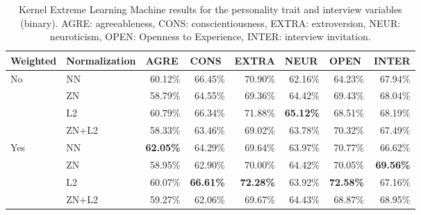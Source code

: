 \begin{table*}[h]
\begin{tabular}{|l|l|r|r|r|r|r|r|}
\hline
\rowcolor{Gray}
Weighted & Normalization & \multicolumn{1}{l|}{AGRE} & \multicolumn{1}{l|}{CONS} & \multicolumn{1}{l|}{EXTRA} & \multicolumn{1}{l|}{NEUR} & \multicolumn{1}{l|}{OPEN} & \multicolumn{1}{l|}{INTER} \\ \hline
\multirow{4}{*}{No} & NN & 60.12\% & 66.45\% & 70.90\% & 62.16\% & 64.23\% & 67.94\% \\ \cline{2-8} 
 & ZN & 58.79\% & 64.55\% & 69.36\% & 64.42\% & 69.43\% & 68.04\% \\ \cline{2-8} 
 & L2 & 60.79\% & 66.34\% & 71.88\% & \textbf{65.12\%} & 68.51\% & 68.19\% \\ \cline{2-8} 
 & ZN+L2 & 58.33\% & 63.46\% & 69.02\% & 63.78\% & 70.32\% & 67.49\% \\ \hline
\multirow{4}{*}{Yes} & NN & \textbf{62.05\%} & 64.29\% & 69.64\% & 63.97\% & 70.77\% & 66.62\% \\ \cline{2-8} 
 & ZN & 58.95\% & 62.90\% & 70.00\% & 64.42\% & 70.05\% & \textbf{69.56\%} \\ \cline{2-8} 
 & L2 & 60.07\% & \textbf{66.61\%} & \textbf{72.28\%} & 63.92\% & \textbf{72.58\%} & 67.16\% \\ \cline{2-8} 
 & ZN+L2 & 59.27\% & 62.06\% & 69.67\% & 64.43\% & 68.87\% & 68.95\% \\ \hline
\end{tabular}
\caption{Kernel Extreme Learning Machine results for the personality trait and interview variables (binary). AGRE: agreeableness, CONS: conscientiousness, EXTRA: extroversion, NEUR: neuroticism, OPEN: Openness to Experience, INTER: interview invitation.}
\label{tab:kelmperson}
\end{table*}

